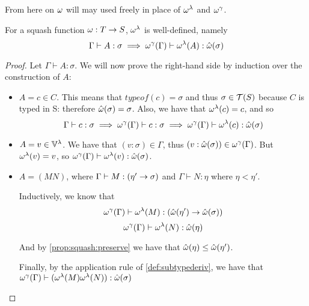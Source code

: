 \documentclass[main.tex]{subfiles}
\begin{document}
From here on $\omega$ will may used freely in place of $\omega^{\lambda}$
and $\omega^{\gamma}$.

\begin{prop}
    For a squash function $\omega: T \rightarrow S$, $\omega^{\lambda}$ is
    well-defined, namely
    \[ \Gamma \vdash A : \sigma \implies
        \omega^{\gamma}(\Gamma) \vdash \omega^{\lambda}(A) : \hat{\omega}(\sigma) \]
\end{prop}
\begin{proof}
    Let $\Gamma \vdash A : \sigma$. We will now prove the right-hand side
    by induction over the construction of $A$:
    \begin{itemize}
        \item $A = c \in C$. This means that $typeof(c) = \sigma$ and thus
            $\sigma \in \mathcal{T}( S )$ because $C$ is typed in S: therefore
            $\hat{\omega}(\sigma) = \sigma$. Also, we have that $\omega^{\lambda}(c) = c$,
            and so \[ \Gamma \vdash c : \sigma \implies
                \omega^{\gamma}(\Gamma) \vdash c : \sigma \implies
                \omega^{\gamma}(\Gamma) \vdash \omega^{\lambda}(c) : \hat{\omega}(\sigma) \]

        \item $A = v \in \mathbb{V}^{\lambda}$. We have that $(v : \sigma) \in \Gamma$, thus
            $(v : \hat{\omega}(\sigma)) \in \omega^{\gamma}(\Gamma)$. But $\omega^{\lambda}(v) = v$,
            so $\omega^{\gamma}(\Gamma) \vdash \omega^{\lambda}(v) : \hat{\omega}(\sigma)$.

        \item $A = (MN)$, where $\Gamma \vdash M : (\eta' \rightarrow \sigma)$
            and $\Gamma \vdash N : \eta$ where $\eta \less \eta'$.

            Inductively, we know that
            \begin{equation}
                \omega^{\gamma}(\Gamma) \vdash \omega^{\lambda}(M) : (\hat{\omega}(\eta')
                    \rightarrow \hat{\omega}(\sigma))
            \end{equation}
            \begin{equation}
                \omega^{\gamma}(\Gamma) \vdash \omega^{\lambda}(N) : \hat{\omega}(\eta)
            \end{equation}

            And by \cref{prop:squash:preserve} we have that $\hat{\omega}(\eta)
                \leq \hat{\omega}(\eta')$.

            Finally, by the application rule of \cref{def:subtypederiv},
            we have that $\omega^{\gamma}(\Gamma) \vdash (\omega^{\lambda}(M) \omega^{\lambda}(N))
            : \hat{\omega}(\sigma) $


\end{itemize}
\end{proof}
\end{document}
